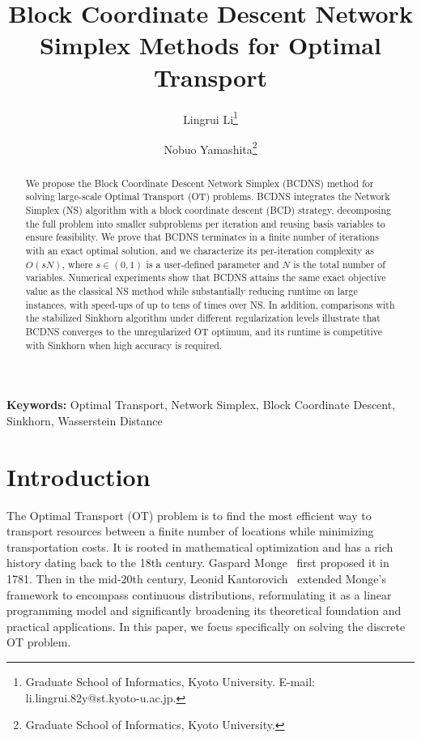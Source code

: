 \documentclass[12pt,a4paper]{article}
\title{Block Coordinate Descent Network Simplex Methods for Optimal Transport}
\author{%
  Lingrui Li\thanks{Graduate School of Informatics, Kyoto University. 
    E-mail: li.lingrui.82y@st.kyoto-u.ac.jp.}%
  \and
  Nobuo Yamashita\thanks{Graduate School of Informatics, Kyoto University.}%
}
\date{}  %
\begin{document}
\maketitle


\begin{abstract}



We propose the Block Coordinate Descent Network Simplex (BCDNS) method for solving large-scale Optimal Transport (OT) problems. BCDNS integrates the Network Simplex (NS) algorithm with a block coordinate descent (BCD) strategy, decomposing the full problem into smaller subproblems per iteration and reusing basis variables to ensure feasibility. We prove that BCDNS terminates in a finite number of iterations with an exact optimal solution, and we characterize its per-iteration complexity as $O(sN)$, where $s\in(0,1)$ is a user-defined parameter and $N$ is the total number of variables. Numerical experiments show that BCDNS attains the same exact objective value as the classical NS method while substantially reducing runtime on large instances, with speed-ups of up to tens of times over NS. In addition, comparisons with the stabilized Sinkhorn algorithm under different regularization levels illustrate that BCDNS converges to the unregularized OT optimum, and its runtime is competitive with Sinkhorn when high accuracy is required.


\end{abstract}



\textbf{Keywords:} Optimal Transport, Network Simplex, Block Coordinate Descent, Sinkhorn, Wasserstein Distance

 




\section{Introduction}

The Optimal Transport (OT) problem is to find the most efficient way to
transport resources between a finite number of locations while minimizing transportation costs. It is rooted in mathematical optimization and has a rich history dating back to the 18th century. Gaspard Monge~\cite{monge1781deblais} first proposed it  in 1781. Then in the mid-20th century, Leonid Kantorovich~\cite{kantorovich1942translocation} extended Monge's framework to encompass continuous distributions, reformulating it as a linear programming model and significantly broadening its theoretical foundation and practical applications. In this paper, we focus specifically on solving the discrete OT problem.
\end{document}
